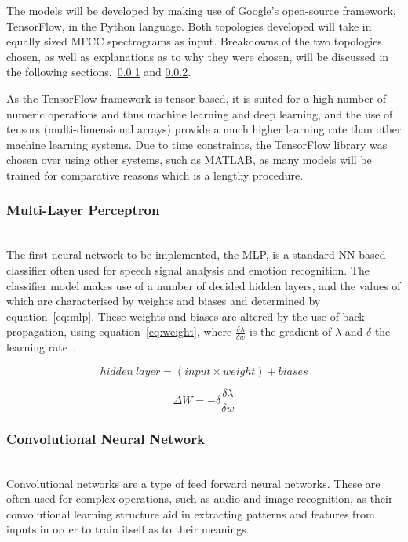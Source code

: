 \documentclass[10pt,twocolumn]{witseiepaper}
\begin{document}
The models will be developed by making use of Google's open-source framework, TensorFlow, in the Python language. Both topologies developed will take in equally sized MFCC spectrograms as input. Breakdowns of the two topologies chosen, as well as explanations as to why they were chosen, will be discussed in the following sections,~\ref{sec:mlp} and \ref{sec:cnn}.

As the TensorFlow framework is tensor-based, it is suited for a high number of numeric operations and thus machine learning and deep learning, and the use of tensors (multi-dimensional arrays) provide a much higher learning rate than other machine learning systems. Due to time constraints, the TensorFlow library was chosen over using other systems, such as MATLAB, as many models will be trained for comparative reasons which is a lengthy procedure. 

\subsubsection{Multi-Layer Perceptron}\label{sec:mlp} \hfill\\
The first neural network to be implemented, the MLP, is a standard NN based classifier often used for speech signal analysis and emotion recognition. The classifier model makes use of a number of decided hidden layers, and the values of which are characterised by weights and biases and determined by equation~\ref{eq:mlp}. These weights and biases are altered by the use of back propagation, using equation~\ref{eq:weight}, where $\frac{\delta \lambda}{\delta w}$ is the gradient of $\lambda$ and $\delta$ the learning rate~\cite{fearMLP}.

\begin{equation}\label{eq:mlp}
hidden~layer = (input \times weight) + biases 
\end{equation}

\begin{equation}\label{eq:weight}
\Delta W =  -\delta \frac{\delta \lambda}{\delta w}  
\end{equation}

\subsubsection{Convolutional Neural Network}\label{sec:cnn} \hfill\\
Convolutional networks are a type of feed forward neural networks. These are often used for complex operations, such as audio and image recognition, as their convolutional learning structure aid in extracting patterns and features from inputs in order to train itself as to their meanings.
\end{document}
